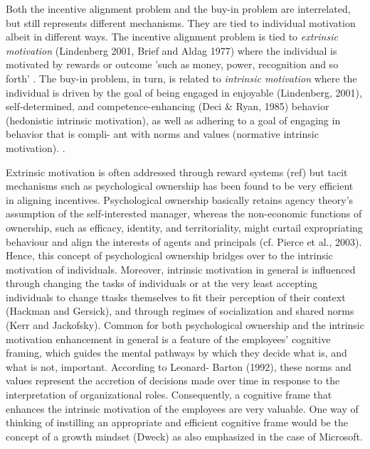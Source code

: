 Both the incentive alignment problem and the buy-in problem are interrelated, but still
represents different mechanisms. They are tied to individual motivation albeit in
different ways. The incentive alignment problem is tied to \emph{extrinsic motivation}
(Lindenberg 2001, Brief and Aldag 1977) where the individual is motivated by rewards or
outcome 'such as money, power, recognition and so forth'
\citep[p. 420]{Gottschalg2007}. The buy-in problem, in turn, is related to \emph{intrinsic
  motivation} where the individual is driven by the goal of being engaged in enjoyable
(Lindenberg, 2001), self-determined, and competence-enhancing (Deci \& Ryan, 1985)
behavior (hedonistic intrinsic motivation), as well as adhering to a goal of engaging in
behavior that is compli- ant with norms and values (normative intrinsic
motivation). .

Extrinsic motivation is often addressed through reward systems (ref) but tacit mechanisms
such as psychological ownership \citep{Sieger2013} has been found to be very efficient in
aligning incentives. Psychological ownership basically retains agency theory’s assumption
of the self-interested manager, whereas the non-economic functions of ownership, such as
efficacy, identity, and territoriality, might curtail expropriating behaviour and align
the interests of agents and principals (cf. Pierce et al., 2003). Hence, this concept of
psychological ownership bridges over to the intrinsic motivation of individuals. Moreover,
intrinsic motivation in general is influenced through changing the tasks of individuals or
at the very least accepting individuals to change ttasks themselves to fit their
perception of their context (Hackman and Gersick), and through regimes of socialization
and shared norms (Kerr and Jackofsky). Common for both psychological ownership and the
intrinsic motivation enhancement in general is a feature of the employees' cognitive
framing, which guides the mental pathways by which they decide what is, and what is not,
important. According to Leonard- Barton (1992), these norms and values represent the
accretion of decisions made over time in response to the interpretation of organizational
roles. Consequently, a cognitive frame that enhances the intrinsic motivation of the
employees are very valuable. One way of thinking of instilling an appropriate and
efficient cognitive frame would be the concept of a growth mindset (Dweck) as also
emphasized in the case of Microsoft.    

